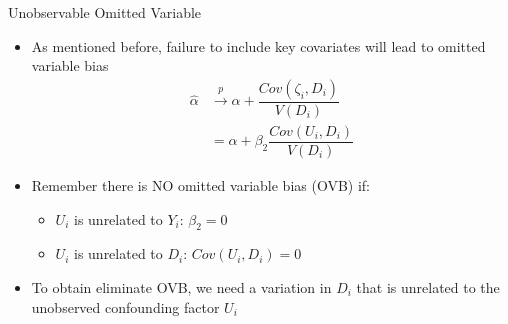 \documentclass[dvipsnames,hyperref={pdfpagelabels=false}]{beamer}
\begin{document}
\begin{frame}{Unobservable Omitted Variable}
	
	\begin{itemize}
		\item As mentioned before, failure to include key covariates will lead to omitted variable bias
		\begin{equation*}
		\begin{aligned}
		\hat{\alpha} &\overset{p}{\rightarrow} \alpha + \dfrac{Cov(\zeta_{i},D_{i})}{V(D_{i})}  \\	
		&= \alpha + \beta_{2} \dfrac{Cov(U_{i},D_{i})}{V(D_{i})}
		\end{aligned}	
		\end{equation*}
		
		
		\item Remember there is NO omitted variable bias (OVB) if:
		\vspace{0.2cm}
		\begin{itemize}
			\item[1] $U_{i}$ is unrelated to $Y_{i}$: $\beta_{2}=0$
			\vspace{0.2cm} 
			\item[2] $U_{i}$ is unrelated to $D_{i}$: $Cov(U_{i},D_{i})=0$
			\vspace{0.2cm}
		\end{itemize}
		\item To obtain eliminate OVB, we need a variation in $D_{i}$ that is unrelated to the unobserved confounding factor $U_{i}$
		
		
	\end{itemize}
	
\end{frame}
\end{document}
